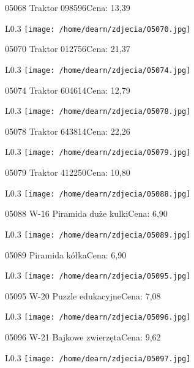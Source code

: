 05068 Traktor    098596Cena: 13,39\newline
\begin{wrapfigure}{L}{0.3\textwidth}
\texttt{[image: /home/dearn/zdjecia/05070.jpg]}
\end{wrapfigure}
05070 Traktor   012756Cena: 21,37\newline
\begin{wrapfigure}{L}{0.3\textwidth}
\texttt{[image: /home/dearn/zdjecia/05074.jpg]}
\end{wrapfigure}
05074 Traktor    604614Cena: 12,79\newline
\begin{wrapfigure}{L}{0.3\textwidth}
\texttt{[image: /home/dearn/zdjecia/05078.jpg]}
\end{wrapfigure}
05078 Traktor    643814Cena: 22,26\newline
\begin{wrapfigure}{L}{0.3\textwidth}
\texttt{[image: /home/dearn/zdjecia/05079.jpg]}
\end{wrapfigure}
05079 Traktor 412250Cena: 10,80\newline
\begin{wrapfigure}{L}{0.3\textwidth}
\texttt{[image: /home/dearn/zdjecia/05088.jpg]}
\end{wrapfigure}
05088 W-16 Piramida duże kulkiCena: 6,90\newline
\begin{wrapfigure}{L}{0.3\textwidth}
\texttt{[image: /home/dearn/zdjecia/05089.jpg]}
\end{wrapfigure}
05089 Piramida kółkaCena: 6,90\newline
\begin{wrapfigure}{L}{0.3\textwidth}
\texttt{[image: /home/dearn/zdjecia/05095.jpg]}
\end{wrapfigure}
05095 W-20 Puzzle edukacyjneCena: 7,08\newline
\begin{wrapfigure}{L}{0.3\textwidth}
\texttt{[image: /home/dearn/zdjecia/05096.jpg]}
\end{wrapfigure}
05096 W-21 Bajkowe zwierzętaCena: 9,62\newline
\begin{wrapfigure}{L}{0.3\textwidth}
\texttt{[image: /home/dearn/zdjecia/05097.jpg]}
\end{wrapfigure}
